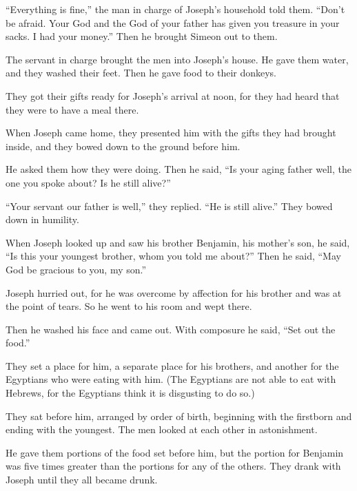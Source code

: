 \begin{scripture}
 ``Everything is fine,'' the man in charge of Joseph's household told them. ``Don't be afraid. Your God and the God of your father has given you treasure in your sacks. I had your money.'' Then he brought Simeon out to them.
\everypar{}

 The servant in charge brought the men into Joseph's house. He gave them water, and they washed their feet. Then he gave food to their donkeys.
 They got their gifts ready for Joseph's arrival at noon, for they had heard that they were to have a meal there.
\everypar{}

 When Joseph came home, they presented him with the gifts they had brought inside, and they bowed down to the ground before him.
 He asked them how they were doing. Then he said, ``Is your aging father well, the one you spoke about? Is he still alive?''
 ``Your servant our father is well,'' they replied. ``He is still alive.'' They bowed down in humility.
\everypar{}

 When Joseph looked up and saw his brother Benjamin, his mother's son, he said, ``Is this your youngest brother, whom you told me about?'' Then he said, ``May God be gracious to you, my son.''
 Joseph hurried out, for he was overcome by affection for his brother and was at the point of tears. So he went to his room and wept there.
\everypar{}

 Then he washed his face and came out. With composure he said, ``Set out the food.''
 They set a place for him, a separate place for his brothers, and another for the Egyptians who were eating with him. (The Egyptians are not able to eat with Hebrews, for the Egyptians think it is disgusting to do so.)
 They sat before him, arranged by order of birth, beginning with the firstborn and ending with the youngest. The men looked at each other in astonishment.
 He gave them portions of the food set before him, but the portion for Benjamin was five times greater than the portions for any of the others. They drank with Joseph until they all became drunk.


\end{scripture}
